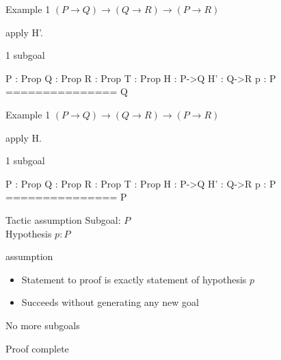 \begin{frame}[fragile]{Example 1}
	$(P \rightarrow Q) \rightarrow (Q \rightarrow R) \rightarrow (P \rightarrow R)$
	\pause
	\begin{user}
		apply H'.
	\end{user}
	\pause
	\begin{coq}
		1 subgoal

		P : Prop
		Q : Prop
		R : Prop
		T : Prop
		H : P->Q
		H' : Q->R
		p : P
		===============
		 Q
	\end{coq}
\end{frame}
\begin{frame}[fragile]{Example 1}
	$(P \rightarrow Q) \rightarrow (Q \rightarrow R) \rightarrow (P \rightarrow R)$
	\pause
	\begin{user}
		apply H.
	\end{user}
	\pause
	\begin{coq}
		1 subgoal

		P : Prop
		Q : Prop
		R : Prop
		T : Prop
		H : P->Q
		H' : Q->R
		p : P
		===============
		 P
	\end{coq}
\end{frame}
\begin{frame}[fragile]{Tactic assumption}
	Subgoal: $P$\\
	\medskip
	Hypothesis $p: P$
	\medskip
	\pause
	\begin{user}
		assumption
	\end{user}
	\begin{itemize}
		\item Statement to proof is exactly statement of hypothesis $p$
		\pause
		\item Succeeds without generating any new goal
	\end{itemize}
	\pause
	\medskip
	\begin{coq}
	No more subgoals
	\end{coq}
	\pause
	Proof complete
\end{frame}
